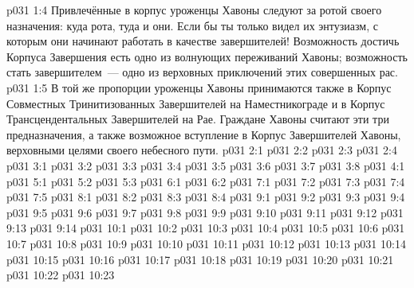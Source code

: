 \vs p031 1:4 Привлечённые в корпус уроженцы Хавоны следуют за ротой своего назначения: куда рота, туда и они. Если бы ты только видел их энтузиазм, с которым они начинают работать в качестве завершителей! Возможность достичь Корпуса Завершения есть одно из волнующих переживаний Хавоны; возможность стать завершителем~--- одно из верховных приключений этих совершенных рас.
\vs p031 1:5 В той же пропорции уроженцы Хавоны принимаются также в Корпус Совместных Тринитизованных Завершителей на Наместникограде и в Корпус Трансцендентальных Завершителей на Рае. Граждане Хавоны считают эти три предназначения, а также возможное вступление в Корпус Завершителей Хавоны, верховными целями своего небесного пути.
\vs p031 2:1 
\vs p031 2:2 \pc 
\vs p031 2:3 \pc 
\vs p031 2:4 
\vs p031 3:1 
\vs p031 3:2 
\vs p031 3:3 \pc 
\vs p031 3:4 
\vs p031 3:5 
\vs p031 3:6 
\vs p031 3:7 
\vs p031 3:8 \pc 
{}
\vs p031 4:1 
\vs p031 5:1 
\vs p031 5:2 
\vs p031 5:3 
\vs p031 6:1 
\vs p031 6:2 
\vs p031 7:1 
\vs p031 7:2 
\vs p031 7:3 \pc 
\vs p031 7:4 
\vs p031 7:5 
\vs p031 8:1 
\vs p031 8:2 
\vs p031 8:3 
\vs p031 8:4 
\vs p031 9:1 
\vs p031 9:2 
\vs p031 9:3 
\vs p031 9:4 
\vs p031 9:5 
\vs p031 9:6 
\vs p031 9:7 
\vs p031 9:8 
\vs p031 9:9 
\vs p031 9:10 \pc 
\vs p031 9:11 \pc 
\vs p031 9:12 
\vs p031 9:13 
\vs p031 9:14 
\vs p031 10:1 
\vs p031 10:2 
\vs p031 10:3 
\vs p031 10:4 
\vs p031 10:5 
\vs p031 10:6 
\vs p031 10:7 
\vs p031 10:8 
\vs p031 10:9 
\vs p031 10:10 
\vs p031 10:11 
\vs p031 10:12 
\vs p031 10:13 
\vs p031 10:14 
\vs p031 10:15 
\vs p031 10:16 
\vs p031 10:17 
\vs p031 10:18 
\vs p031 10:19 \pc 
\vs p031 10:20 \pc 
\vsetoff
\vs p031 10:21 
\vs p031 10:22 
\vs p031 10:23 
\quizlink
